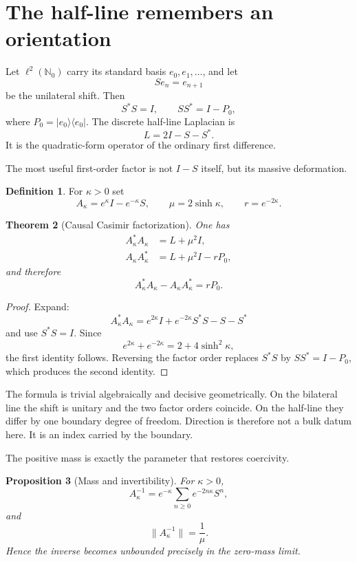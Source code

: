 \documentclass[11pt]{article}
\newtheorem{theorem}{Theorem}[section]
\newtheorem{proposition}[theorem]{Proposition}
\theoremstyle{definition}
\newtheorem{definition}[theorem]{Definition}
\theoremstyle{remark}
\newcommand{\N}{\mathbb N}
\begin{document}
\section{The half-line remembers an orientation}

Let \(\ell^2(\N_0)\) carry its standard basis \(e_0,e_1,\ldots\), and let
\[
Se_n=e_{n+1}
\]
be the unilateral shift.  Then
\[
S^*S=I,\qquad SS^*=I-P_0,
\]
where \(P_0=|e_0\rangle\langle e_0|\).  The discrete half-line Laplacian is
\[
L=2I-S-S^*.
\]
It is the quadratic-form operator of the ordinary first difference.

The most useful first-order factor is not \(I-S\) itself, but its massive deformation.

\begin{definition}
For \(\kappa>0\) set
\[
A_\kappa=e^\kappa I-e^{-\kappa}S,
\qquad
\mu=2\sinh\kappa,
\qquad
r=e^{-2\kappa}.
\]
\end{definition}

\begin{theorem}[Causal Casimir factorization]
One has
\begin{align}
A_\kappa^*A_\kappa&=L+\mu^2I,\\
A_\kappa A_\kappa^*&=L+\mu^2I-rP_0,
\end{align}
and therefore
\[
\boxed{
A_\kappa^*A_\kappa-A_\kappa A_\kappa^*=rP_0.
}
\]
\end{theorem}

\begin{proof}
Expand:
\[
A_\kappa^*A_\kappa
=e^{2\kappa}I+e^{-2\kappa}S^*S-S-S^*
\]
and use \(S^*S=I\).  Since
\[
e^{2\kappa}+e^{-2\kappa}=2+4\sinh^2\kappa,
\]
the first identity follows.  Reversing the factor order replaces \(S^*S\) by
\(SS^*=I-P_0\), which produces the second identity.
\end{proof}

The formula is trivial algebraically and decisive geometrically.  On the bilateral line the shift is unitary and the two factor orders coincide.  On the half-line they differ by one boundary degree of freedom.  Direction is therefore not a bulk datum here.  It is an index carried by the boundary.

The positive mass is exactly the parameter that restores coercivity.

\begin{proposition}[Mass and invertibility]
For \(\kappa>0\),
\[
A_\kappa^{-1}
=e^{-\kappa}\sum_{n\ge0}e^{-2n\kappa}S^n,
\]
and
\[
\|A_\kappa^{-1}\|=\frac{1}{\mu}.
\]
Hence the inverse becomes unbounded precisely in the zero-mass limit.
\end{proposition}
\end{document}
